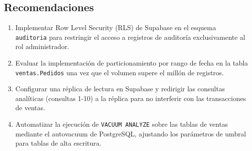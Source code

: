 \subsection{Recomendaciones}

\begin{enumerate}
  \item Implementar Row Level Security (RLS) de Supabase en el esquema \texttt{auditoria} para restringir el acceso a registros de auditor\'ia exclusivamente al rol administrador.
  \item Evaluar la implementaci\'on de particionamiento por rango de fecha en la tabla \texttt{ventas.Pedidos} una vez que el volumen supere el mill\'on de registros.
  \item Configurar una r\'eplica de lectura en Supabase y redirigir las consultas anal\'iticas (consultas 1-10) a la r\'eplica para no interferir con las transacciones de ventas.
  \item Automatizar la ejecuci\'on de \texttt{VACUUM ANALYZE} sobre las tablas de ventas mediante el autovacuum de PostgreSQL, ajustando los par\'ametros de umbral para tablas de alta escritura.
\end{enumerate}
